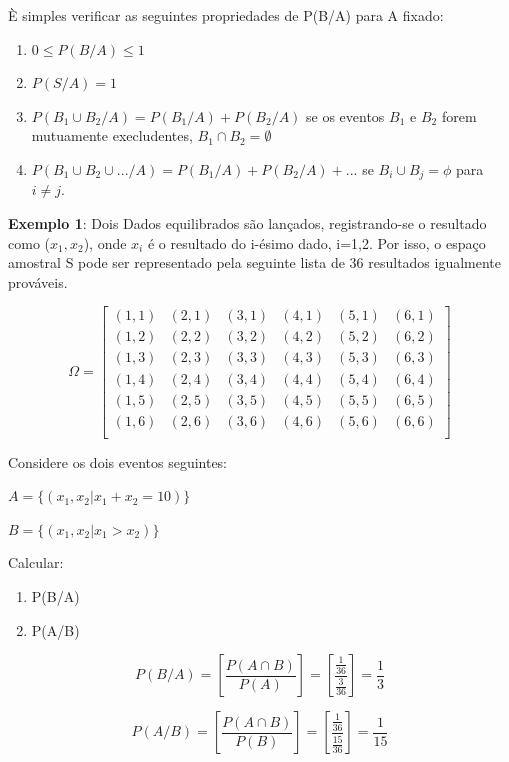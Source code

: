 È simples verificar as seguintes propriedades de P(B/A) para A
fixado:

\begin{enumerate}
    \item $0 \leq P(B/A) \leq 1$
    \item $P(S/A)=1$
     \item $P(B_{1} \cup B_{2}/A) = P(B_{1}/A)+P(B_{2}/A)$ se os
     eventos $B_{1}$ e $B_{2}$ forem mutuamente execludentes, $B_{1}\cap B_{2}=\emptyset$
     \item $P(B_{1} \cup B_{2} \cup ... / A) =
     P(B_{1}/A)+P(B_{2}/A)+...$ se $B_{i}\cup B_{j}=\phi$ para $i\neq
     j$.
\end{enumerate}

\textbf{Exemplo 1}: Dois Dados equilibrados são lançados,
registrando-se o resultado como ($x_{1},x_{2}$), onde $x_{i}$ é o
resultado do i-ésimo dado, i=1,2. Por isso, o espaço amostral S
pode ser representado pela seguinte lista de 36 resultados
igualmente prováveis.

$$
\Omega =
\left[%
\begin{array}{cccccc}
  (1,1) & (2,1) & (3,1) & (4,1) & (5,1) & (6,1) \\
  (1,2) & (2,2) & (3,2) & (4,2) & (5,2) & (6,2) \\
  (1,3) & (2,3) & (3,3) & (4,3) & (5,3) & (6,3) \\
  (1,4) & (2,4) & (3,4) & (4,4) & (5,4) & (6,4) \\
  (1,5) & (2,5) & (3,5) & (4,5) & (5,5) & (6,5) \\
  (1,6) & (2,6) & (3,6) & (4,6) & (5,6) & (6,6) \\
\end{array}%
\right]
$$

Considere os dois eventos seguintes:\vskip0.3cm

$A=\{(x_{1},x_{2}|x_{1}+x_{2}=10)\}$

$B=\{(x_{1},x_{2}|x_{1}>x_{2})\}$

\vskip0.3cm

Calcular:

\begin{enumerate}
    \item P(B/A)
    \item P(A/B)
\end{enumerate}


$$P(B/A) = \left[ \frac{P(A \cap B)}{P(A)} \right] = \left[ \frac{\frac{1}{36}}{\frac{3}{36}} \right] = \frac{1}{3} $$


$$P(A/B) = \left[ \frac{P(A \cap B)}{P(B)} \right] =  \left[ \frac{\frac{1}{36}}{\frac{15}{36}} \right] = \frac{1}{15}$$

